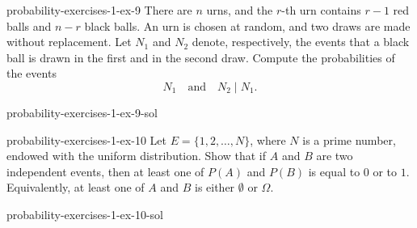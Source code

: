 \documentclass[preview]{standalone}
\begin{document}
\begin{snippetexercise}{probability-exercises-1-ex-9}{}
    There are \(n\) urns, and the \(r\)-th urn contains \(r-1\) red balls and
    \(n-r\) black balls. An urn is chosen at random, and two draws are made without
    replacement. Let \(N_1\) and \(N_2\) denote, respectively, the events that a
    black ball is drawn in the first and in the second draw. Compute the probabilities
    of the events
    \[
        N_1
        \quad\text{and}\quad
        N_2 \mid N_1.
    \]
\end{snippetexercise}

\begin{snippetsolution}{probability-exercises-1-ex-9-sol}{}
    \todo
\end{snippetsolution}

\begin{snippetexercise}{probability-exercises-1-ex-10}{}
    Let \(E = \{1,2,\ldots,N\}\), where \(N\) is a prime number, endowed with the
    uniform distribution. Show that if \(A\) and \(B\) are two independent events,
    then at least one of \(P(A)\) and \(P(B)\) is equal to \(0\) or to \(1\).
    Equivalently, at least one of \(A\) and \(B\) is either \(\emptyset\) or
    \(\Omega\).
\end{snippetexercise}

\begin{snippetsolution}{probability-exercises-1-ex-10-sol}{}
    \todo
\end{snippetsolution}
\end{document}
